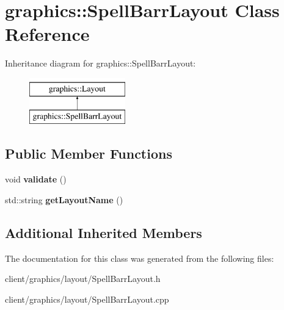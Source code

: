\hypertarget{classgraphics_1_1_spell_barr_layout}{\section{graphics\-:\-:Spell\-Barr\-Layout Class Reference}
\label{classgraphics_1_1_spell_barr_layout}
}
Inheritance diagram for graphics\-:\-:Spell\-Barr\-Layout\-:\begin{figure}[H]
\begin{center}
\leavevmode
\includegraphics[height=2.000000cm]{classgraphics_1_1_spell_barr_layout}
\end{center}
\end{figure}
\subsection*{Public Member Functions}
\begin{DoxyCompactItemize}
\item 
\hypertarget{classgraphics_1_1_spell_barr_layout_acf92175ced94034ddc0574c08aa71917}{void {\bfseries validate} ()}\label{classgraphics_1_1_spell_barr_layout_acf92175ced94034ddc0574c08aa71917}

\item 
\hypertarget{classgraphics_1_1_spell_barr_layout_a495c09ed2dee97b724ea6a8f9fa7a215}{std\-::string {\bfseries get\-Layout\-Name} ()}\label{classgraphics_1_1_spell_barr_layout_a495c09ed2dee97b724ea6a8f9fa7a215}

\end{DoxyCompactItemize}
\subsection*{Additional Inherited Members}


The documentation for this class was generated from the following files\-:\begin{DoxyCompactItemize}
\item 
client/graphics/layout/Spell\-Barr\-Layout.\-h\item 
client/graphics/layout/Spell\-Barr\-Layout.\-cpp\end{DoxyCompactItemize}
